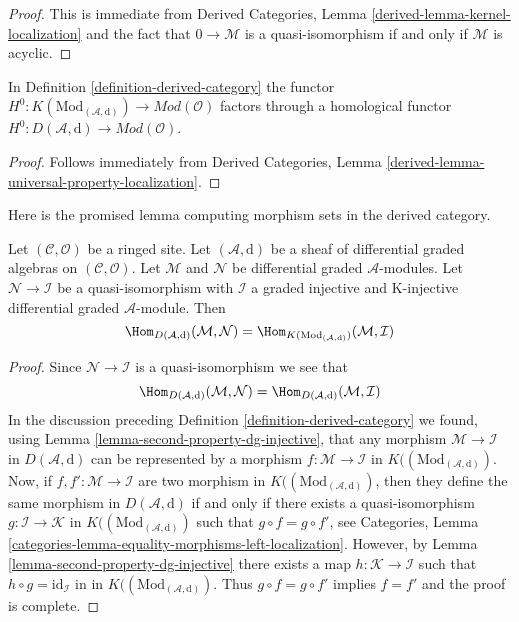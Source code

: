 \begin{proof}
This is immediate from
Derived Categories, Lemma \ref{derived-lemma-kernel-localization}
and the fact that $0 \to \mathcal{M}$ is a quasi-isomorphism
if and only if $\mathcal{M}$ is acyclic.
\end{proof}

\begin{lemma}
\label{lemma-H0-over-D}
In Definition \ref{definition-derived-category} the functor
$H^0 : K(\text{Mod}_{(\mathcal{A}, \text{d})}) \to
\textit{Mod}(\mathcal{O})$ factors through a homological functor
$H^0 : D(\mathcal{A}, \text{d}) \to \textit{Mod}(\mathcal{O})$.
\end{lemma}

\begin{proof}
Follows immediately from
Derived Categories, Lemma \ref{derived-lemma-universal-property-localization}.
\end{proof}

\noindent
Here is the promised lemma computing morphism sets in the
derived category.

\begin{lemma}
\label{lemma-hom-derived}
Let $(\mathcal{C}, \mathcal{O})$ be a ringed site. Let
$(\mathcal{A}, \text{d})$ be a sheaf of differential graded algebras
on $(\mathcal{C}, \mathcal{O})$.
Let $\mathcal{M}$ and $\mathcal{N}$ be differential graded
$\mathcal{A}$-modules. Let $\mathcal{N} \to \mathcal{I}$ be a
quasi-isomorphism with $\mathcal{I}$ a graded injective and
K-injective differential graded $\mathcal{A}$-module. Then
$$
\Hom_{D(\mathcal{A}, \text{d})}(\mathcal{M}, \mathcal{N}) =
\Hom_{K(\text{Mod}_{(\mathcal{A}, \text{d})})}(\mathcal{M}, \mathcal{I})
$$
\end{lemma}

\begin{proof}
Since $\mathcal{N} \to \mathcal{I}$ is a quasi-isomorphism
we see that
$$
\Hom_{D(\mathcal{A}, \text{d})}(\mathcal{M}, \mathcal{N}) =
\Hom_{D(\mathcal{A}, \text{d})}(\mathcal{M}, \mathcal{I})
$$
In the discussion preceding Definition \ref{definition-derived-category}
we found, using Lemma \ref{lemma-second-property-dg-injective},
that any morphism $\mathcal{M} \to \mathcal{I}$
in $D(\mathcal{A}, \text{d})$ can be represented by a morphism
$f : \mathcal{M} \to \mathcal{I}$ in
$K((\text{Mod}_{(\mathcal{A}, \text{d})})$.
Now, if $f, f' :  \mathcal{M} \to \mathcal{I}$ are two morphism in
$K((\text{Mod}_{(\mathcal{A}, \text{d})})$, then they define
the same morphism in $D(\mathcal{A}, \text{d})$ if and only
if there exists a quasi-isomorphism $g : \mathcal{I} \to \mathcal{K}$
in $K((\text{Mod}_{(\mathcal{A}, \text{d})})$
such that $g \circ f = g \circ f'$, see
Categories, Lemma \ref{categories-lemma-equality-morphisms-left-localization}.
However, by Lemma \ref{lemma-second-property-dg-injective} there
exists a map
$h : \mathcal{K} \to \mathcal{I}$
such that $h \circ g = \text{id}_\mathcal{I}$ in
in $K((\text{Mod}_{(\mathcal{A}, \text{d})})$.
Thus $g \circ f = g \circ f'$ implies $f = f'$ and
the proof is complete.
\end{proof}

